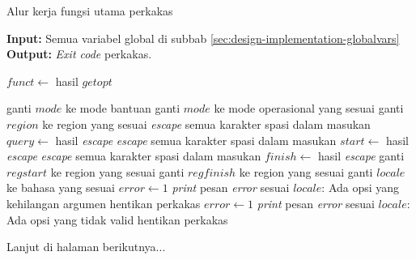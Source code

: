 \begin{algorithm}[h]
	\caption{\textendash\xspace Alur kerja fungsi utama perkakas}
	\label{alg:design-main}
	\vspace{-0.6\baselineskip}
	\begin{flushleft}
		\textbf{Input:} Semua variabel global di subbab \ref{sec:design-implementation-globalvars} \\
		\textbf{Output:} \textit{Exit code} perkakas. \\
	\end{flushleft}
	\vspace{-1.05\baselineskip}
	\begin{algorithmic}
		 
			\State $funct \gets$ hasil $getopt$
			
					 
						\State ganti $mode$ ke mode bantuan
					\EndIf
				\EndCase
						\State ganti $mode$ ke mode operasional yang sesuai
					\EndIf
				\EndCase
					\State ganti $region$ ke region yang sesuai
				\EndCase
						\State \textit{escape} semua karakter spasi dalam masukan
						\State $query \gets$ hasil \textit{escape}
					\EndIf
				\EndCase
						\State \textit{escape} semua karakter spasi dalam masukan
						\State $start \gets$ hasil \textit{escape}
					\EndIf
				\EndCase
						\State \textit{escape} semua karakter spasi dalam masukan
						\State $finish \gets$ hasil \textit{escape}
					\EndIf
				\EndCase
					\State ganti $regstart$ ke region yang sesuai
				\EndCase
					\State ganti $regfinish$ ke region yang sesuai
				\EndCase
					\State ganti $locale$ ke bahasa yang sesuai
				\EndCase
				\Case{\textquotesingle :\textquotesingle}
					\State $error \gets 1$
					\State \textit{print} pesan \textit{error} sesuai $locale$: Ada opsi yang kehilangan argumen
					\State hentikan perkakas
				\EndCase
					\State $error \gets 1$
					\State \textit{print} pesan \textit{error} sesuai $locale$: Ada opsi yang tidak valid
					\State hentikan perkakas
				\EndCase
			\EndSwitch
		\EndWhile
	\end{algorithmic}
	\begin{flushright}
		Lanjut di halaman berikutnya...
	\end{flushright}
	\vspace{-0.95\baselineskip}
\end{algorithm}
